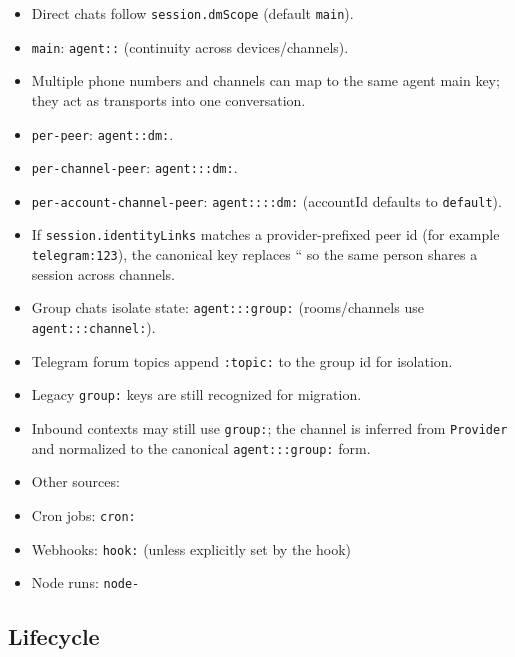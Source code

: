 \begin{itemize}
  \item Direct chats follow \texttt{session.dmScope} (default \texttt{main}).
  \item \texttt{main}: \texttt{agent::} (continuity across devices/channels).
  \item Multiple phone numbers and channels can map to the same agent main key; they act as transports into one conversation.
  \item \texttt{per-peer}: \texttt{agent::dm:}.
  \item \texttt{per-channel-peer}: \texttt{agent:::dm:}.
  \item \texttt{per-account-channel-peer}: \texttt{agent::::dm:} (accountId defaults to \texttt{default}).
  \item If \texttt{session.identityLinks} matches a provider-prefixed peer id (for example \texttt{telegram:123}), the canonical key replaces `` so the same person shares a session across channels.
  \item Group chats isolate state: \texttt{agent:::group:} (rooms/channels use \texttt{agent:::channel:}).
  \item Telegram forum topics append \texttt{:topic:} to the group id for isolation.
  \item Legacy \texttt{group:} keys are still recognized for migration.
  \item Inbound contexts may still use \texttt{group:}; the channel is inferred from \texttt{Provider} and normalized to the canonical \texttt{agent:::group:} form.
  \item Other sources:
  \item Cron jobs: \texttt{cron:}
  \item Webhooks: \texttt{hook:} (unless explicitly set by the hook)
  \item Node runs: \texttt{node-}
\end{itemize}


\subsection{Lifecycle}


